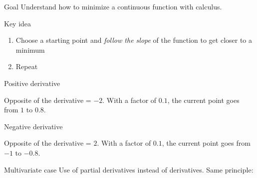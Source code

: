 
\begin{frame}{Goal}
  Understand how to minimize a continuous function with calculus.
\end{frame}

\begin{frame}{Key idea}

  \begin{enumerate}[<+->]
    \item Choose a starting point and \emph{follow the slope} of the function to get closer to a minimum
    \item Repeat
  \end{enumerate}


\end{frame}

\begin{frame}{Positive derivative}


  Opposite of the derivative = $-2$. With a factor of $0.1$, the current point goes from $1$ to $0.8$.
\end{frame}

\begin{frame}{Negative derivative}


  Opposite of the derivative = $2$. With a factor of $0.1$, the current point goes from $-1$ to $-0.8$.
\end{frame}

\begin{frame}{Multivariate case}
  Use of partial derivatives instead of derivatives. Same principle:
\end{frame}
